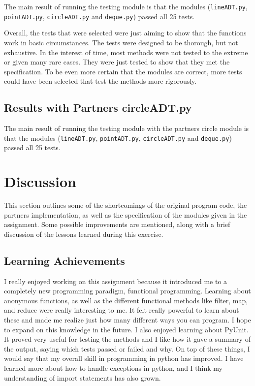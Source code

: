 \documentclass[12pt]{article}
\begin{document}
The main result of running the testing module is that the modules ({\tt lineADT.py}, {\tt pointADT.py}, {\tt circleADT.py} and {\tt deque.py}) passed all 25 tests. 

Overall, the tests that were selected were just aiming to show that the functions work in basic circumstances. The tests were designed to be thorough, but not exhaustive. In the interest of time, most methods were not tested to the extreme or given many rare cases. They were just tested to show that they met the specification. To be even more certain that the modules are correct, more tests could have been selected that test the methods more rigorously. 

\subsection{Results with Partners circleADT.py}

The main result of running the testing module with the partners circle module is that the modules ({\tt lineADT.py}, {\tt pointADT.py}, {\tt circleADT.py} and {\tt deque.py}) passed all 25 tests. 

\section{Discussion}

This section outlines some of the shortcomings of the original program code, the partners implementation, as well as the specification of the modules given in the assignment. Some possible improvements are mentioned, along with a brief discussion of the lessons learned during this exercise. 

\subsection{Learning Achievements}

I really enjoyed working on this assignment because it introduced me to a completely new programming paradigm, functional programming. Learning about anonymous functions, as well as the different functional methods like filter, map, and reduce were really interesting to me. It felt really powerful to learn about these and made me realize just how many different ways you can program. I hope to expand on this knowledge in the future. I also enjoyed learning about PyUnit. It proved very useful for testing the methods and I like how it gave a summary of the output, saying which tests passed or failed and why. On top of these things, I would say that my overall skill in programming in python has improved. I have learned more about how to handle exceptions in python, and I think my understanding of import statements has also grown. 
\end{document}
